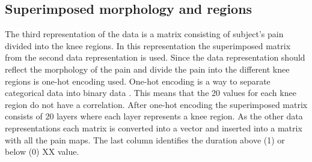 \subsection{Superimposed morphology and regions}
The third representation of the data is a matrix consisting of subject's pain divided into the knee regions.
\noindent
In this representation the superimposed matrix from the second data representation is used. Since the data representation should reflect the morphology of the pain and divide the pain into the different knee regions is one-hot encoding used. One-hot encoding is a way to separate categorical data into binary data \citep{Harris2012}. This means that the 20 values for each knee region do not have a correlation. After one-hot encoding the superimposed matrix consists of 20 layers where each layer represents a knee region.
As the other data representations each matrix is converted into a vector and inserted into a matrix with all the pain maps. The last column identifies the duration above (1) or below (0) XX value. 
